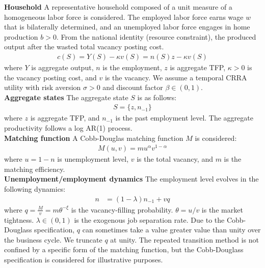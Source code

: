 \noindent\textbf{Household}\hspace{3mm} A representative household composed of a unit measure of a homogeneous labor force is considered.
The employed labor force earns wage $w$ that is bilaterally determined, and an unemployed labor force engages in home production $b>0$. 
From the national identity (resource constraint), the produced output after the wasted total vacancy posting cost.
\begin{align*}
  c(S) = Y(S) - \kappa v(S) = n(S)z - \kappa v(S)
\end{align*}
where $Y$ is aggregate output, $n$ is the employment, $z$ is aggregate TFP, $\kappa>0$ is the vacancy posting cost, and $v$ is the vacancy. We assume a temporal CRRA utility with risk aversion $\sigma>0$ and discount factor $\beta\in(0,1)$.
\\

\noindent\textbf{Aggregate states} \hspace{3mm} The aggregate state $S$ is as follows:
\begin{align*}
  S = \{z,n{_{-1}}\}
\end{align*}
where $z$ is aggregate TFP, and $n_{-1}$ is the past employment level. The aggregate productivity follows a log AR(1) process.
\\

\noindent\textbf{Matching function} \hspace{3mm} A Cobb-Douglas matching function $M$ is considered:
\begin{align*}
  M(u,v) = m u^{\alpha}v^{1-\alpha}
\end{align*}
where $u=1-n$ is unemployment level, $v$ is the total vacancy, and $m$ is the matching efficiency.
\\

\noindent\textbf{Unemployment/employment dynamics} \hspace{3mm} The employment level evolves in the following dynamics:
\begin{align*}
  n &= (1-\lambda)n_{-1}+ vq
\end{align*}
where $q = \frac{M}{v} = m \theta^{-\xi}$ is the vacancy-filling probability. $\theta=u/v$ is the market tightness. $\lambda\in(0,1)$ is the exogenous job separation rate.
Due to the Cobb-Douglass specification, $q$ can sometimes take a value greater value than unity over the business cycle. We truncate $q$ at unity. The repeated transition method is not confined by a specific form of the matching function, but the Cobb-Douglass specification is considered for illustrative purposes.
\\

